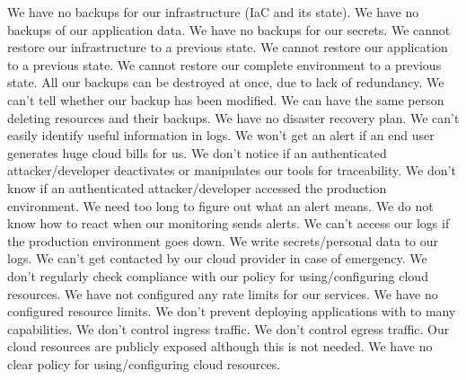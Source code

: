  {We have no backups for our infrastructure (IaC and its state).}
 {We have no backups of our application data.}
 {We have no backups for our secrets.}
 {We cannot restore our infrastructure to a previous state.}
 {We cannot restore our application to a previous state.}
 {We cannot restore our complete environment to a previous state.}
 {All our backups can be destroyed at once, due to lack of redundancy.}
 {We can't tell whether our backup has been modified.}
 {We can have the same person deleting resources and their backups.}
 {We have no disaster recovery plan.}
%
 {We can't easily identify useful information in logs.}
 {We won't get an alert if an end user generates huge cloud bills for us.}
 {We don't notice if an authenticated attacker/developer deactivates or manipulates our tools for traceability.}
 {We don't know if an authenticated attacker/developer accessed the production environment.}
 {We need too long to figure out what an alert means.}
 {We do not know how to react when our monitoring sends alerts.}
 {We can't access our logs if the production environment goes down.}
 {We write secrets/personal data to our logs.}
%
 {We can't get contacted by our cloud provider in case of emergency.}
 {We don't regularly check compliance with our policy for using/configuring cloud resources.}
 {We have not configured any rate limits for our services.}
 {We have no configured resource limits.}
 {We don't prevent deploying applications with to many capabilities.}
 {We don't control ingress traffic.}
 {We don't control egress traffic.}
 {Our cloud resources are publicly exposed although this is not needed.}
 {We have no clear policy for using/configuring cloud resources.}
